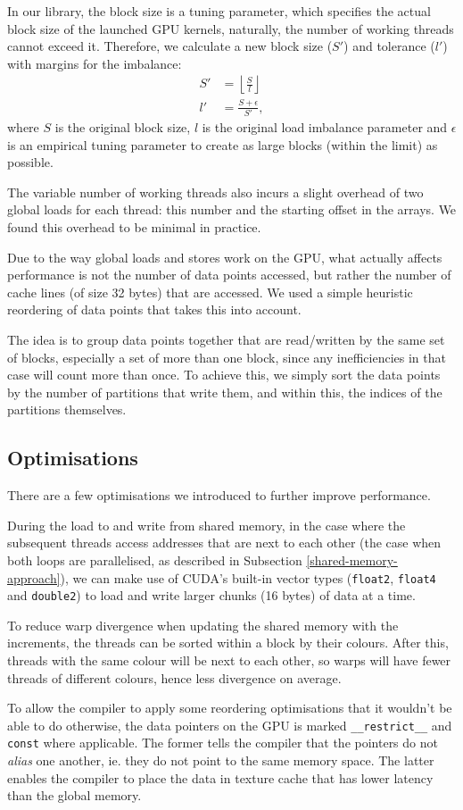 In our library, the block size is a tuning parameter, which specifies the actual
block size of the launched GPU kernels, naturally, the number of working threads
cannot exceed it. Therefore, we calculate a new block size ($S'$) and tolerance
($l'$) with margins for the imbalance:
\begin{align}
  S' &= \left\lfloor \frac{S}{l} \right\rfloor \\
  l' &= \frac{S + \epsilon}{S'},
\end{align}
where $S$ is the original block size, $l$ is the original load imbalance
parameter and $\epsilon$ is an empirical tuning parameter to create as large
blocks (within the limit) as possible.

The variable number of working threads also incurs a slight overhead of two
global loads for each thread: this number and the starting offset in the arrays.
We found this overhead to be minimal in practice.

Due to the way global loads and stores work on the GPU, what actually affects
performance is not the number of data points accessed, but rather the number of
cache lines (of size 32 bytes) that are accessed. We used a simple heuristic
reordering of data points that takes this into account.

The idea is to group data points together that are read/written by the same set
of blocks, especially a set of more than one block, since any inefficiencies in
that case will count more than once. To achieve this, we simply sort the data
points by the number of partitions that write them, and within this, the indices
of the partitions themselves.

\subsection{Optimisations}\label{optimisations}

There are a few optimisations we introduced to further improve performance.

During the load to and write from shared memory, in the case where the
subsequent threads access addresses that are next to each other (the case when
both loops are parallelised, as described in Subsection
\ref{shared-memory-approach}), we can make use of CUDA's built-in vector
types (\lstinline!float2!, \lstinline!float4! and \lstinline!double2!) to load
and write larger chunks (16 bytes) of data at a time.

To reduce warp divergence when updating the shared memory with the increments,
the threads can be sorted within a block by their colours. After this, threads
with the same colour will be next to each other, so warps will have fewer threads
of different colours, hence less divergence on average.

To allow the compiler to apply some reordering optimisations that it wouldn't be
able to do otherwise, the data pointers on the GPU is marked
\lstinline!__restrict__! and \lstinline!const! where applicable. The former
tells the compiler that the pointers do not \emph{alias} one another, ie. they
do not point to the same memory space. The latter enables the compiler to place
the data in texture cache that has lower latency than the global memory.


